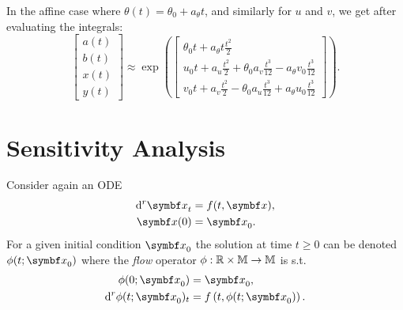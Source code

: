 \begin{important}
  In the affine case where $\theta(t) = \theta_0 + a_\theta t$, and similarly for $u$ and $v$, we get after evaluating the integrals:
  \begin{equation*}
    \begin{bmatrix}
      a(t) \\
      b(t) \\
      x(t) \\
      y(t)
    \end{bmatrix} \approx \exp \left( \begin{bmatrix} \theta_0 t + a_\theta t \frac{t^2}{2}                                                 \\
      u_0 t + a_u \frac{t^2}{2} + \theta_0 a_v \frac{t^3}{12} - a_\theta v_0 \frac{t^3}{12} \\
      v_0 t + a_v \frac{t^2}{2} - \theta_0 a_u \frac{t^3}{12} + a_\theta u_0 \frac{t^3}{12}\end{bmatrix} \right).
  \end{equation*}
\end{important}


\section{Sensitivity Analysis}

Consider again an ODE
\begin{equation}
  \label{eq:ode_sensitivity}
  \begin{aligned}
    \mathrm{d}^r \x_t & = f(t, \x), \\
    \x(0)             & = \x_{0}.
  \end{aligned}
\end{equation}
For a given initial condition $\x_{0}$ the solution at time $t \geq 0$ can be denoted $\phi(t; \x_{0})$ where the \emph{flow} operator $\phi : \mathbb{R} \times \mathbb{M} \rightarrow \mathbb{M}$ is s.t.
\begin{equation}
  \begin{aligned}
    \phi(0; \x_{0})                    & = \x_{0},                            \\
    \mathrm{d}^{r} \phi(t; \x_{0})_{t} & = f\left(t, \phi(t; \x_{0}) \right).
  \end{aligned}
\end{equation}

